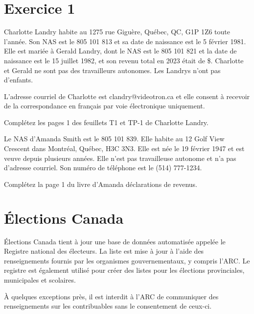 \section{Exercice 1}
\setcounter{question}{0}
\begin{question}
	Charlotte Landry habite au 1275 rue Giguère, Québec, QC, G1P 1Z6 toute l’année. Son NAS est le 805 101 813 et sa date de naissance est le 5 février 1981. Elle est mariée à Gerald Landry, dont le NAS est le 805 101 821 et la date de naissance est le 15 juillet 1982, et son revenu total en 2023 était de  \$. Charlotte et Gerald ne sont pas des travailleurs autonomes. Les Landrys n’ont pas d’enfants.
	
	L’adresse courriel de Charlotte est clandry@videotron.ca et elle consent à recevoir de la correspondance en français par voie électronique uniquement.
	
	Complétez les pages 1 des feuillets T1 et TP-1 de Charlotte Landry.
\end{question}



\begin{question}
	Le NAS d’Amanda Smith est le 805 101 839. Elle habite au 12 Golf View Crescent dans Montréal, Québec, H3C 3N3. Elle est née le 19 février 1947 et est veuve depuis plusieurs années. Elle n’est pas travailleuse autonome et n’a pas d’adresse courriel. Son numéro de téléphone est le (514) 777-1234.
	
	Complétez la page 1 du livre d’Amanda déclarations de revenus.
\end{question}





\section{Élections Canada}
\begin{intro}
	Élections Canada tient à jour une base de données automatisée appelée le Registre national des électeurs. La liste est mise à jour à l'aide des renseignements fournis par les organismes gouvernementaux, y compris l'ARC. Le registre est également utilisé pour créer des listes pour les élections provinciales, municipales et scolaires.
\end{intro}
À quelques exceptions près, il est interdit à l'ARC de communiquer des renseignements sur les contribuables sans le consentement de ceux-ci.


